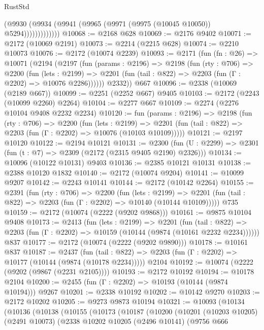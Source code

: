 \begin{lexlean}{RustStd}
\begin{coremodule}
                    (@9930 (@9934 (@9941 (@9965 (@9971 (@9975 (@10045 @10050)) @5294)))))))))))))
@10068 := @2168 @628
@10069 := @2176 @9402
@10071 := @2172 (@10069 @2191)
@10073 := @2214 (@2215 @628)
@10074 := @2210 @10073
@10076 := @2172 (@10074 @2239)
@10093 := @2171
    (fun (fn : @26) =>
    @10071
      (@2194
        (@2197
          (fun (params : @2196) =>
          @2198
            (fun (rty : @706) =>
            @2200
              (fun (lets : @2199) =>
              @2201 (fun (tail : @822) => @2203 (fun (Γ : @2202) => @10076 @2286))))))
        @2332))
    @667
@10096 := @2338 (@10069 (@2189 @667))
@10099 := @2251 (@2252 @667) @9405
@10103 := @2172 (@2243 (@10099 @2260) @2264)
@10104 := @2277 @667
@10109 := @2274 (@2276 @10104 @9408 @2232 @2234)
@10120 := fun (params : @2196) =>
  @2198
    (fun (rty : @706) =>
    @2200
      (fun (lets : @2199) =>
      @2201 (fun (tail : @822) => @2203 (fun (Γ : @2202) => @10076 (@10103 @10109)))))
@10121 := @2197 @10120
@10122 := @2194 @10121
@10131 := @2300 (fun (U : @2299) => @2301 (fun (t : @7) => @2309 (@2172 (@2315 @9405 @2190) @2326)))
@10134 := @10096 (@10122 @10131) @9403
@10136 := @2385 @10121 @10131
@10138 := @2388 @10120 @1832
@10140 := @2172 (@10074 @9204)
@10141 := @10099 @9207
@10142 := @2243 @10141
@10144 := @2172 (@10142 @2264)
@10155 := @2391
    (fun (rty : @706) =>
    @2200
      (fun (lets : @2199) =>
      @2201 (fun (tail : @822) => @2203 (fun (Γ : @2202) => @10140 (@10144 @10109)))))
    @735
@10159 := @2172 (@10074 (@2222 (@9202 @9868)))
@10161 := @9875 @10104 @9408
@10173 := @2413
    (fun (lets : @2199) =>
    @2201
      (fun (tail : @822) =>
      @2203 (fun (Γ : @2202) => @10159 (@10144 (@9874 (@10161 @2232 @2234))))))
    @837
@10177 := @2172 (@10074 (@2222 (@9202 @9890)))
@10178 := @10161 @837
@10187 := @2437
    (fun (tail : @822) => @2203 (fun (Γ : @2202) => @10177 (@10144 (@9874 (@10178 @2234)))))
    @2104
@10192 := @10074 (@2222 (@9202 (@9867 (@2231 @2105))))
@10193 := @2172 @10192
@10194 := @10178 @2104
@10200 := @2455 (fun (Γ : @2202) => @10193 (@10144 (@9874 @10194))) @9267
@10201 := @2338 @10192
@10202 := @10142 @9270
@10203 := @2172 @10202
@10205 := @9273 @9873 @10194
@10321 := @10093
    (@10134
      (@10136
        (@10138
          (@10155
            (@10173
              (@10187
                (@10200
                  (@10201
                    (@10203 @10205)
                    (@2491 @10073)
                    (@2338
                      @10202
                      @10205
                      (@2496 @10141)
                      (@9756
                        @666

\end{coremodule}
\end{lexlean}
